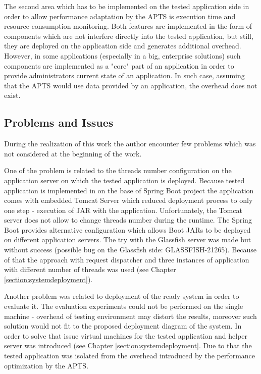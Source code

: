 \documentclass[12pt,a4paper]{article}
\begin{document}
The second area which has to be implemented on the tested application side in order to allow performance adaptation by the APTS is execution time and resource consumption monitoring. Both features are implemented in the form of components which are not interfere directly into the tested application, but still, they are deployed on the application side and generates additional overhead. However, in some applications (especially in a big, enterprise solutions) such components are implemented as a "core" part of an application in order to provide administrators current state of an application. In such case, assuming that the APTS would use data provided by an application, the overhead does not exist. 



\subsection{Problems and Issues}

During the realization of this work the author encounter few problems which was not considered at the beginning of the work.

One of the problem is related to the threads number configuration on the application server on which the tested application is deployed. Because tested application is implemented in on the base of Spring Boot project the application comes with embedded Tomcat Server which reduced deployment process to only one step - execution of JAR with the application. Unfortunately, the Tomcat server does not allow to change threads number during the runtime. The Spring Boot provides alternative configuration which allows Boot JARs to be deployed on different application servers. The try with the Glassfish server was made but without success (possible bug on the Glassfish side: GLASSFISH-21265).  Because of that the approach with request dispatcher and three instances of application with different number of threads was used (see Chapter \ref{section:systemdeployment}). 

Another problem was related to deployment of the ready system in order to evaluate it. The evaluation experiments could not be performed on the single machine - overhead of testing environment may distort the results, moreover such solution would not fit to the proposed deployment diagram of the system. In order to solve that issue virtual machines for the tested application and helper server was introduced (see Chapter \ref{section:systemdeployment}. Due to that the tested application was isolated from the overhead introduced by the performance optimization by the APTS. 
\end{document}
